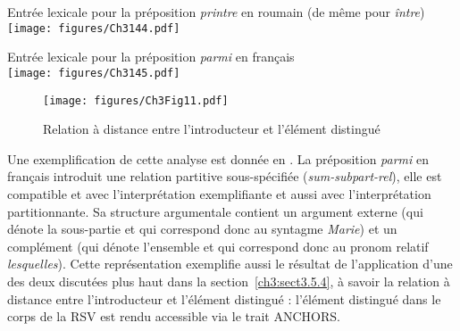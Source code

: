\ea \label{ch3:ex144}
Entrée lexicale pour la préposition \textit{printre} en roumain (de même pour \textit{între})\\
\texttt{[image: figures/Ch3144.pdf]}


\z


\newpage 
\ea \label{ch3:ex145}
Entrée lexicale pour la préposition \textit{parmi} en français\\
\texttt{[image: figures/Ch3145.pdf]} 
\z

\begin{figure}
\texttt{[image: figures/Ch3Fig11.pdf]}  
\caption{Relation à distance entre l’introducteur et l’élément distingué}
\label{ch3:fig11}
\end{figure}



Une exemplification de cette analyse est donnée en . La préposition \textit{parmi} en français introduit une relation partitive sous-spécifiée (\textit{sum-subpart-rel}), {\cad} elle est compatible et avec l’interprétation exemplifiante et aussi avec l’inter\-prétation partitionnante. Sa structure argumentale contient un argument externe (qui dénote la sous-partie et qui correspond donc au syntagme \textit{Marie}) et un complément (qui dénote l’ensemble et qui correspond donc au pronom relatif \textit{lesquelles}). Cette représentation exemplifie aussi le résultat de l’application d’une des deux  discutées plus haut dans la section~\ref{ch3:sect3.5.4}, à savoir la relation à distance entre l’introducteur et l’élément distingué : l’élément distingué dans le corps de la RSV est rendu accessible via le trait ANCHORS.

